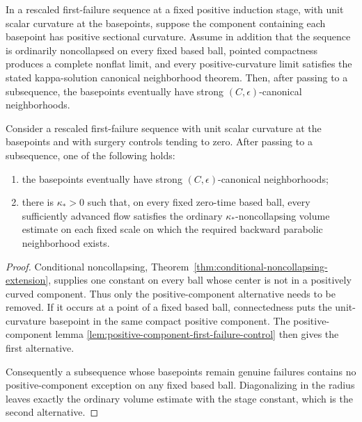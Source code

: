 \begin{lemma}
\label{lem:positive-component-first-failure-control}
\notready
In a rescaled first-failure sequence at a fixed positive induction stage,
with unit scalar curvature at the basepoints, suppose the component
containing each basepoint has positive sectional curvature.  Assume in
addition that the sequence is ordinarily noncollapsed on every fixed based
ball, pointed compactness produces a complete nonflat limit, and every
positive-curvature limit satisfies the stated kappa-solution canonical
neighborhood theorem.  Then, after passing to a subsequence, the basepoints
eventually have strong
$(C,\epsilon)$-canonical neighborhoods.
\end{lemma}

\begin{lemma}
\label{lem:first-failure-noncollapsing-bridge}
\notready
Consider a rescaled first-failure sequence with unit scalar curvature at the
basepoints and with surgery controls tending to zero.  After passing to a
subsequence, one of the following holds:
\begin{enumerate}
\item the basepoints eventually have strong
      $(C,\epsilon)$-canonical neighborhoods;
\item there is $\kappa_*>0$ such that, on every fixed zero-time based ball,
      every sufficiently advanced flow satisfies the ordinary
      $\kappa_*$-noncollapsing volume estimate on each fixed scale on which
      the required backward parabolic neighborhood exists.
\end{enumerate}
\end{lemma}

\begin{proof}
Conditional noncollapsing,
Theorem~\ref{thm:conditional-noncollapsing-extension}, supplies one constant
on every ball whose center is not in a positively curved component.  Thus
only the positive-component alternative needs to be removed.  If it occurs
at a point of a fixed based ball, connectedness puts the unit-curvature
basepoint in the same compact positive component.  The positive-component
lemma \ref{lem:positive-component-first-failure-control} then gives the
first alternative.

Consequently a subsequence whose basepoints remain genuine failures contains
no positive-component exception on any fixed based ball.  Diagonalizing in
the radius leaves exactly the ordinary volume estimate with the stage
constant, which is the second alternative.
\end{proof}

